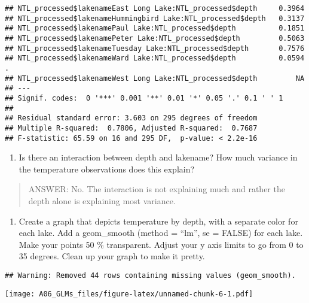 \documentclass[]{article}
\newenvironment{Shaded}{\begin{snugshade}}{\end{snugshade}}
\newcommand{\KeywordTok}[1]{\textcolor[rgb]{0.13,0.29,0.53}{\textbf{#1}}}
\newcommand{\DataTypeTok}[1]{\textcolor[rgb]{0.13,0.29,0.53}{#1}}
\newcommand{\DecValTok}[1]{\textcolor[rgb]{0.00,0.00,0.81}{#1}}
\newcommand{\FloatTok}[1]{\textcolor[rgb]{0.00,0.00,0.81}{#1}}
\newcommand{\StringTok}[1]{\textcolor[rgb]{0.31,0.60,0.02}{#1}}
\newcommand{\CommentTok}[1]{\textcolor[rgb]{0.56,0.35,0.01}{\textit{#1}}}
\newcommand{\OtherTok}[1]{\textcolor[rgb]{0.56,0.35,0.01}{#1}}
\newcommand{\OperatorTok}[1]{\textcolor[rgb]{0.81,0.36,0.00}{\textbf{#1}}}
\newcommand{\NormalTok}[1]{#1}
\providecommand{\tightlist}{%
  \setlength{\itemsep}{0pt}\setlength{\parskip}{0pt}}
\begin{document}
\begin{verbatim}
## NTL_processed$lakenameEast Long Lake:NTL_processed$depth     0.3964    
## NTL_processed$lakenameHummingbird Lake:NTL_processed$depth   0.3137    
## NTL_processed$lakenamePaul Lake:NTL_processed$depth          0.1851    
## NTL_processed$lakenamePeter Lake:NTL_processed$depth         0.5063    
## NTL_processed$lakenameTuesday Lake:NTL_processed$depth       0.7576    
## NTL_processed$lakenameWard Lake:NTL_processed$depth          0.0594 .  
## NTL_processed$lakenameWest Long Lake:NTL_processed$depth         NA    
## ---
## Signif. codes:  0 '***' 0.001 '**' 0.01 '*' 0.05 '.' 0.1 ' ' 1
## 
## Residual standard error: 3.603 on 295 degrees of freedom
## Multiple R-squared:  0.7806, Adjusted R-squared:  0.7687 
## F-statistic: 65.59 on 16 and 295 DF,  p-value: < 2.2e-16
\end{verbatim}

\begin{enumerate}
\def\labelenumi{\arabic{enumi}.}
\setcounter{enumi}{14}
\tightlist
\item
  Is there an interaction between depth and lakename? How much variance
  in the temperature observations does this explain?
\end{enumerate}

\begin{quote}
ANSWER: No. The interaction is not explaining much and rather the depth
alone is explaining most variance.
\end{quote}

\begin{enumerate}
\def\labelenumi{\arabic{enumi}.}
\setcounter{enumi}{15}
\tightlist
\item
  Create a graph that depicts temperature by depth, with a separate
  color for each lake. Add a geom\_smooth (method = ``lm'', se = FALSE)
  for each lake. Make your points 50 \% transparent. Adjust your y axis
  limits to go from 0 to 35 degrees. Clean up your graph to make it
  pretty.
\end{enumerate}

\begin{Shaded}
\end{Shaded}

\begin{verbatim}
## Warning: Removed 44 rows containing missing values (geom_smooth).
\end{verbatim}

\texttt{[image: A06\_GLMs\_files/figure-latex/unnamed-chunk-6-1.pdf]}
\end{document}

